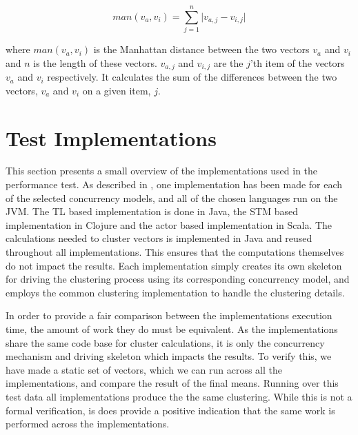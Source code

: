 \begin{equation}\label{eq:mandistance}
man(v_a,v_i)=\sum_{j=1}^{n}\lvert v_{a,j}-v_{i,j}\rvert
\end{equation}

where $man(v_a,v_i)$ is the Manhattan distance between the two vectors $v_a$ and $v_i$ and $n$ is the length of these vectors. $v_{a,j}$ and $v_{i,j}$ are the $j$'th item of the vectors $v_a$ and $v_i$ respectively. It calculates the sum of the differences between the two vectors, $v_{a}$ and $v_{i}$ on a given item, $j$.


%

\section{Test Implementations}
This section presents a small overview of the implementations used in the performance test. As described in , one implementation has been made for each of the selected concurrency models, and all of the chosen languages run on the \ac{JVM}. The \ac{TL} based implementation is done in Java, the \ac{STM} based implementation in Clojure and the actor based implementation in Scala. The calculations needed to cluster vectors is implemented in Java and reused throughout all implementations. This ensures that the computations themselves do not impact the results. Each implementation simply creates its own skeleton for driving the clustering process using its corresponding concurrency model, and employs the common clustering implementation to handle the clustering details. 

In order to provide a fair comparison between the implementations execution time, the amount of work they do must be equivalent. As the implementations share the same code base for cluster calculations, it is only the concurrency mechanism and driving skeleton which impacts the results. To verify this, we have made a static set of vectors, which we can run across all the implementations, and compare the result of the final means. Running over this test data all implementations produce the the same clustering. While this is not a formal verification, is does provide a positive indication that the same work is performed across the implementations.
%
